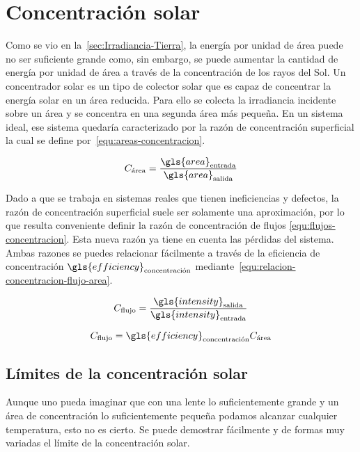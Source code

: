 \section{Concentración solar}

	Como se vio en la~\cref{sec:Irradiancia-Tierra}, la energía por unidad de área puede no ser suficiente grande como, sin embargo, se puede aumentar la cantidad de energía por unidad de área a través de la concentración de los rayos del Sol. Un concentrador solar es un tipo de colector solar que es capaz de concentrar la energía solar en un área reducida. Para ello se colecta la irradiancia incidente sobre un área y se concentra en una segunda área más pequeña. En un sistema ideal, ese sistema quedaría caracterizado por la razón de concentración superficial la cual se define por~\eqref{equ:areas-concentracion}.
	
	\begin{equation}\label{equ:areas-concentracion}
		C_{\text{área}} = \dfrac{\gls{area}_{\text{entrada}}}{\gls{area}_{\text{salida}}}
	\end{equation}
	
	Dado a que se trabaja en sistemas reales que tienen ineficiencias y defectos, la razón de concentración superficial suele ser solamente una aproximación, por lo que resulta conveniente definir la razón de concentración de flujos \eqref{equ:flujos-concentracion}. Esta nueva razón ya tiene en cuenta las pérdidas del sistema. Ambas razones se puedes relacionar fácilmente a través de la eficiencia de concentración $\gls{efficiency}_{\text{concentración}}$ mediante~\eqref{equ:relacion-concentracion-flujo-area}.
	
	\begin{equation}\label{equ:flujos-concentracion}
		C_{\text{flujo}} = \dfrac{\gls{intensity}_{\text{salida}}}{\gls{intensity}_{\text{entrada}}}
	\end{equation}
	
	\begin{equation}\label{equ:relacion-concentracion-flujo-area}
		C_{\text{flujo}} = \gls{efficiency}_{\text{concentración}} C_{\text{área}}
	\end{equation}
	
	\subsection{Límites de la concentración solar}
		
		Aunque uno pueda imaginar que con una lente lo suficientemente grande y un área de concentración lo suficientemente pequeña podamos alcanzar cualquier temperatura, esto no es cierto. Se puede demostrar fácilmente y de formas muy variadas el límite de la concentración solar.
		
